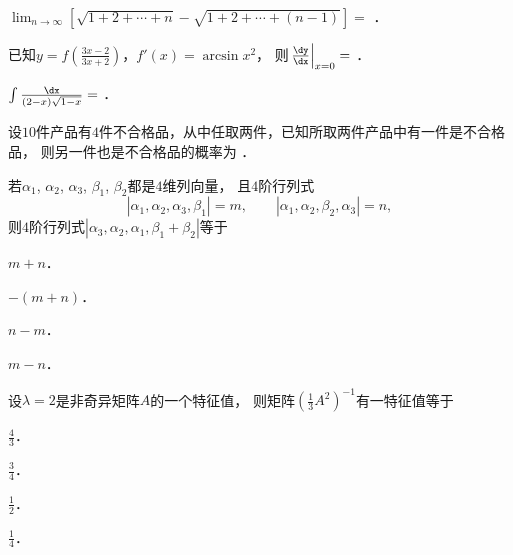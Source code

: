 \documentclass[plain,noanswer,medmath]{../../template/jnuexam}
\begin{document}






\begin{problem}
$\lim_{n \to \infty} \left[\sqrt{1 + 2 + \cdots + n} - \sqrt{1 + 2 + \cdots + (n - 1)} \right] =$ \fillin{}．
\end{problem}


\begin{problem}
已知$y = f\left(\frac{3x - 2}{3x + 2} \right)$，$f'(x) = \arcsin x^2$，
则$\left. \frac{\dy}{\dx} \right|_{x = 0} =$ \fillin{}．
\end{problem}


\begin{problem}
$\int \frac{\dx}{(2 - x)\sqrt{1 - x}} =$ \fillin{}．
\end{problem}




\begin{problem}
设$10$件产品有$4$件不合格品，从中任取两件，已知所取两件产品中有一件是不合格品，
则另一件也是不合格品的概率为 \fillin{}．
\end{problem}








\begin{problem}
若$\alpha_1$, $\alpha_2$, $\alpha_3$, $\beta_1$, $\beta_2$都是$4$维列向量，
且$4$阶行列式
$$|\alpha_1, \alpha_2, \alpha_3, \beta_1| = m,\qquad
  |\alpha_1, \alpha_2, \beta_2, \alpha_3| = n,$$
则$4$阶行列式$|\alpha_3,\alpha_2,\alpha_1,\beta_1 + \beta_2|$等于\pickout{}
\begin{abcd}
\item $m + n$．      
\item $- (m + n)$．      
\item $n - m$．      
\item $m - n$．
\end{abcd}
\end{problem}


\begin{problem}
设$\lambda = 2$是非奇异矩阵$A$的一个特征值，
则矩阵$\left(\tfrac{1}{3}A^2\right)^{-1}$有一特征值等于\pickout{}
\begin{abcd}
\item $\frac{4}{3}$．			
\item $\frac{3}{4}$．			
\item $\frac{1}{2}$．			
\item $\frac{1}{4}$．
\end{abcd}
\end{problem}
\end{document}
